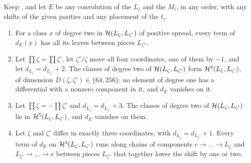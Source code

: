 \begin{lemma}\label{lem:efourspread}
Keep , and let $E$ be any convolution of the
$L_{\zeta}$ and the $M_{i}$, in any order, with any shifts of the given
parities and any placement of the $t_{i}$.
\begin{enumerate}[label=\textup{(\roman*)},leftmargin=2.6em,itemsep=2pt]
\item For a class $x$ of degree two in $\mathcal{H}(L_{\zeta},L_{\zeta'})$ of
  positive spread, every term of $d_{E}(x)$ has all its leaves between
  pieces $L_{\zeta''}$.
\item Let $\prod\zeta=\prod\zeta'$, let $\zeta'/\zeta$ move all four
  coordinates, one of them by $-1$, and let $d_{L_{\zeta}}=d_{L_{\zeta'}}+2$.
  The classes of degree two of $\mathcal{H}(L_{\zeta},L_{\zeta'})$ form
  $\mathcal{H}^{4}(L_{\zeta},L_{\zeta'})$, of dimension $D(\zeta,\zeta')\in\{64,256\}$;
  no element of degree one has a differential with a nonzero component in
  it, and $d_{E}$ vanishes on it.
\item Let $\prod\zeta=-\prod\zeta'$ and $d_{L_{\zeta}}=d_{L_{\zeta'}}+3$. The
  classes of degree two of $\mathcal{H}(L_{\zeta},L_{\zeta'})$ lie in
  $\mathcal{H}^{5}(L_{\zeta},L_{\zeta'})$, and $d_{E}$ vanishes on them.
\item Let $\zeta$ and $\zeta'$ differ in exactly three coordinates, with
  $d_{L_{\zeta}}=d_{L_{\zeta'}}+1$. Every term of $d_{E}$ on
  $\mathcal{H}^{3}(L_{\zeta},L_{\zeta'})$ runs along chains of components
  $c\to\dots\to L_{\zeta}$ and $L_{\zeta'}\to\dots\to e$ between pieces
  $L_{\zeta''}$ that together lower the shift by one or two.
\end{enumerate}
\end{lemma}

